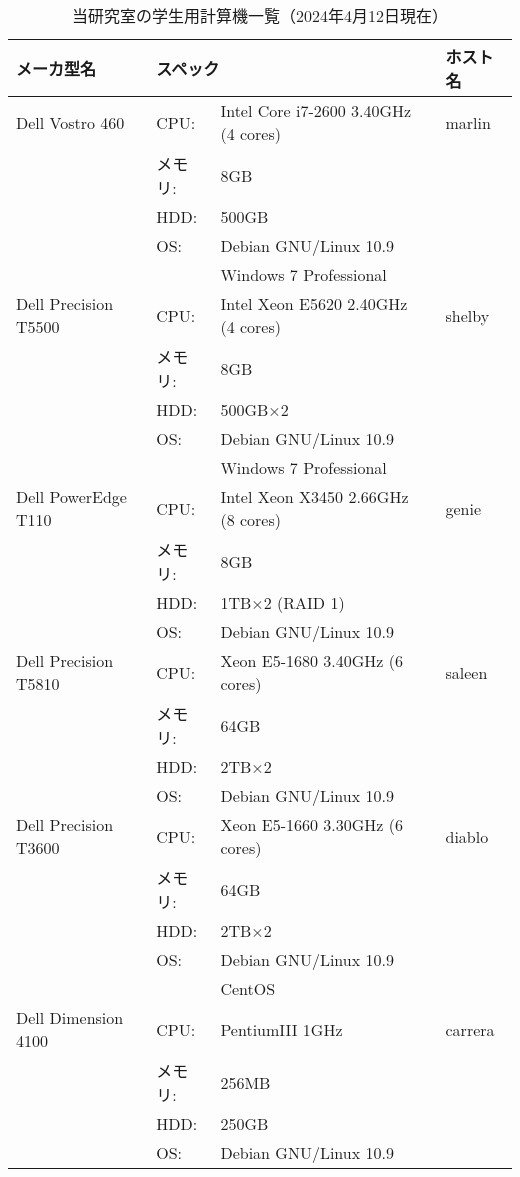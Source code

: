 \documentclass[main]{subfiles}
\begin{document}
\begin{table}[p]
    \caption{当研究室の学生用計算機一覧（2024年4月12日現在）}
    \label{tab:computers}
    \begin{center}
    \begin{tabular}{|l|l@{\hspace{0.5em}}l@{\hspace{1em}}l|l|}
    \hline
    メーカ型名 & \multicolumn{3}{l|}{スペック} & ホスト名 \\
    \hline
    Dell Vostro 460 
     & CPU:    & Intel Core i7-2600 3.40GHz (4 cores) & & marlin \\
     & メモリ: & 8GB & & \\
     & HDD:    & 500GB & & \\
     & OS:     & Debian GNU/Linux 10.9 & & \\
     &         & Windows 7 Professional & & \\
    \hline
    Dell Precision T5500 
     & CPU:    & Intel Xeon E5620 2.40GHz (4 cores) & & shelby \\
     & メモリ: & 8GB & & \\
     & HDD:    & 500GB×2 & & \\
     & OS:     & Debian GNU/Linux 10.9 & & \\
     &         & Windows 7 Professional & & \\
    \hline
    Dell PowerEdge T110 
     & CPU:    & Intel Xeon X3450 2.66GHz (8 cores) & & genie \\
     & メモリ: & 8GB & & \\
     & HDD:    & 1TB×2 (RAID 1) & & \\
     & OS:     & Debian GNU/Linux 10.9 & & \\
    \hline
    Dell Precision T5810 
     & CPU:    & Xeon E5-1680 3.40GHz (6 cores) & & saleen \\
     & メモリ: & 64GB & & \\
     & HDD:    & 2TB×2 & & \\
     & OS:     & Debian GNU/Linux 10.9 & & \\
    \hline
    Dell Precision T3600 
     & CPU:    & Xeon E5-1660 3.30GHz (6 cores) & & diablo \\
     & メモリ: & 64GB & & \\
     & HDD:    & 2TB×2 & & \\
     & OS:     & Debian GNU/Linux 10.9 & & \\
     &         & CentOS & & \\
    \hline
    Dell Dimension 4100 
     & CPU:    & PentiumIII 1GHz & & carrera \\
     & メモリ: & 256MB & & \\
     & HDD:    & 250GB & & \\
     & OS:     & Debian GNU/Linux 10.9 & & \\
    \hline
    \end{tabular}
    \end{center}
\end{table}
\end{document}
